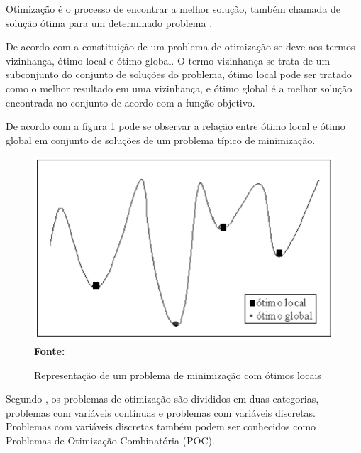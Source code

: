 

Otimização é o processo de encontrar a melhor solução, também chamada de solução ótima para um determinado problema \cite{timoteo2005desenvolvimento}.\par

De acordo com \cite{steiglitz1982combinatorial} a constituição de um problema de otimização se deve aos termos vizinhança, ótimo local e ótimo global. O termo vizinhança se trata de um subconjunto do conjunto de soluções do problema, ótimo local pode ser tratado como o melhor resultado em uma vizinhança, e ótimo global é a melhor solução encontrada no conjunto de acordo com a função objetivo.\par

De acordo com a figura 1 pode se observar a relação entre ótimo local e ótimo global em conjunto de soluções de um problema típico de minimização.\par

\begin{figure}[!htb]
\caption[Representação de um problema de minimização com ótimos locais]{Representação de um problema de minimização com ótimos locais}
\label{fig:figura2}
\centering
\includegraphics[scale=0.55]{imagens/problemaOtimizacao.png}
\\ \textbf{\footnotesize Fonte: \cite{timoteo2005desenvolvimento}}
\end{figure}
	
Segundo \cite{steiglitz1982combinatorial}, os problemas de otimização são divididos em duas categorias, problemas com variáveis contínuas e problemas com variáveis discretas. Problemas com variáveis discretas também podem ser conhecidos como Problemas de Otimização Combinatória (POC).\par

